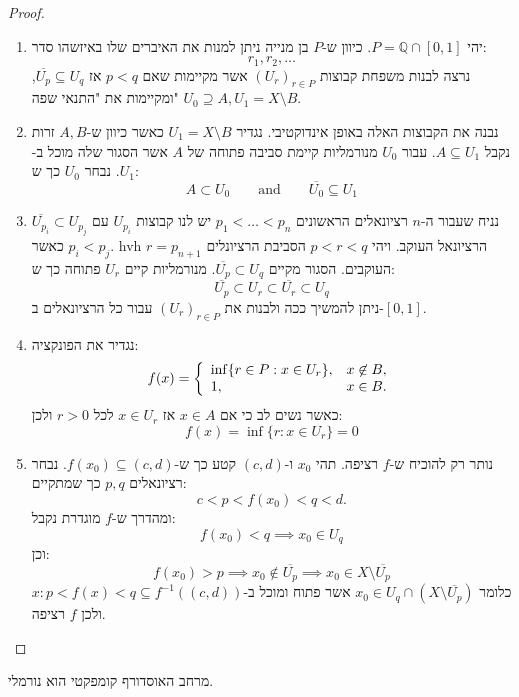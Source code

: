 \documentclass{tstextbook}
\begin{document}
\begin{proof}
  \begin{enumerate}
    \item יהי \(P=\mathbb{Q}\cap [0,1]\). כיוון ש-\(P\) בן מנייה ניתן למנות את האיברים שלו באיזשהו סדר: 
$$r_{1},r_{2},\dots$$
נרצה לבנות משפחת קבוצות \((U_r)_{r \in P}\) אשר מקיימות שאם \(p<q\) אז \(\overline{U_{p}}\subseteq U_{q}\), ומקיימות את "התנאי שפה" \(U_{0}\supseteq A,U_{1}=X\setminus B\).


    \item נבנה את הקבוצות האלה באופן אינדוקטיבי. נגדיר \(U_{1}=X\setminus B\) כאשר כיוון ש-\(A,B\) זרות נקבל \(A\subseteq U_{1}\). עבור \(U_{0}\) מנורמליות קיימת סביבה פתוחה של \(A\) אשר הסגור שלה מוכל ב-\(U_{1}\). נבחר \(U_{0}\) כך ש: 
$$A\subset U_{0}\qquad \text{and}\qquad \overline{U_{0}} \subseteq U_{1}$$


    \item נניח שעבור ה-\(n\) רציונאלים הראשונים \(p_{1}<\dots<p_{n}\) יש לנו קבוצות \(U_{p_{i}}\) עם \(\overline{U_{p_{i}}}\subset U_{p_{j}}\) כאשר \(p_{i}<p_{j}\). hvh \(r=p_{n+1}\) הרציונאל העוקב. ויהי \(p<r<q\) הסביבת הרציונלים העוקבים. הסגור מקיים \(\overline{U_{p}}\subset U_{q}\). מנורמליות קיים \(U_{r}\) פתוחה כך ש: 
$$\overline{{{U_{p}}}}\subset U_{r}\subset\overline{{{U_{r}}}}\subset U_{q}$$
ניתן להמשיך ככה ולבנות את \((U_r)_{r\in P}\) עבור כל הרציונאלים ב-\([0,1]\).


    \item נגדיר את הפונקציה: 
$$f(x)=\left\{\begin{array}{l l}{\operatorname*{inf}\{r\in P:x\in U_{r}\},}&{x\not\in B,}\\ {1,}&{x\in B.}\end{array}\right.$$
כאשר נשים לב כי אם \(x \in A\) אז \(x \in U_{r}\) לכל \(r> 0\) ולכן:
$$f(x)=\inf\{r: x\in U_r\}=0$$


    \item נותר רק להוכיח ש-\(f\) רציפה. תהי \(x_{0}\) ו-\((c,d)\) קטע כך ש-\(f(x_{0})\subseteq(c,d)\). נבחר רציונאלים \(p,q\) כך שמתקיים: 
$$c<p<f(x_{0})<q<d.$$
ומהדרך ש-\(f\) מוגדרת נקבל:
$$f(x_0) < q \implies x_0 \in U_q$$
וכן:
$$f(x_0) > p \implies x_0 \notin \overline{U_p} \implies x_0 \in X \setminus \overline{U_p}$$
כלומר \(x_{0}\in U_{q}\cap\left(X\setminus{\overline{{U_{p}}}}\right)\) אשר פתוח ומוכל ב-\({x : p < f(x) < q} \subseteq f^{-1}((c,d))\) ולכן \(f\) רציפה.


  \end{enumerate}
\end{proof}
\begin{proposition}
מרחב האוסדורף קומפקטי הוא נורמלי.

\end{proposition}
\end{document}
